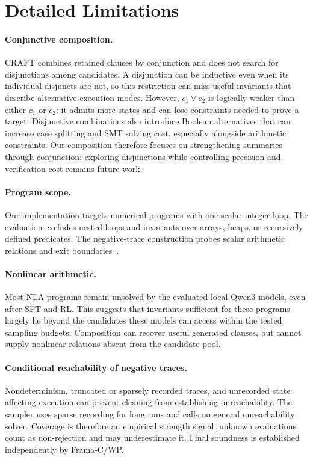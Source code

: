 \endgroup

\section{Detailed Limitations}
\label{app:limitations}

\paragraph{Conjunctive composition.}
CRAFT combines retained clauses by conjunction and does not search for
disjunctions among candidates. A disjunction can be inductive even when its
individual disjuncts are not, so this restriction can miss useful invariants
that describe alternative execution modes. However, \(c_1\lor c_2\) is
logically weaker than either \(c_1\) or \(c_2\): it admits more states and
can lose constraints needed to prove a target. Disjunctive combinations also
introduce Boolean alternatives that can increase case splitting and SMT
solving cost, especially alongside arithmetic constraints. Our composition
therefore focuses on strengthening summaries through conjunction; exploring
disjunctions while controlling precision and verification cost remains future
work.

\paragraph{Program scope.}
Our implementation targets numerical programs with one scalar-integer loop.
The evaluation excludes nested loops and invariants over arrays, heaps, or
recursively defined predicates. The negative-trace construction probes scalar
arithmetic relations and exit boundaries~\citep{liu2024towards}.

\paragraph{Nonlinear arithmetic.}
Most NLA programs remain unsolved by the evaluated local Qwen3 models,
even after SFT and RL. This suggests that invariants sufficient for these
programs largely lie beyond the candidates these models can access within
the tested sampling budgets. Composition can recover useful generated
clauses, but cannot supply nonlinear relations absent from the candidate pool.

\paragraph{Conditional reachability of negative traces.}
Nondeterminism, truncated or sparsely recorded traces, and unrecorded state
affecting execution can prevent cleaning from establishing unreachability.
The sampler uses sparse recording for long runs and calls no general
unreachability solver.  Coverage is therefore an empirical strength signal;
\textsf{unknown} evaluations count as non-rejection and may underestimate it.
Final soundness is established independently by Frama-C/WP.

